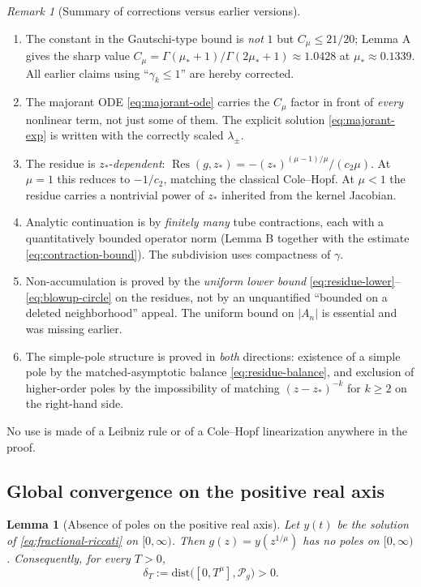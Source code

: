 \documentclass[11pt]{article}
\newtheorem{lemma}[theorem]{Lemma}
\theoremstyle{definition}
\theoremstyle{remark}
\newtheorem{remark}[theorem]{Remark}
\DeclareMathOperator{\Res}{Res}
\begin{document}
\begin{remark}[Summary of corrections versus earlier versions]
\label{rem:meromorphy-corrections}
\begin{enumerate}[label=(\alph*)]
\item The constant in the Gautschi-type bound is \emph{not} $1$ but $C_{\mu}\le 21/20$; Lemma A gives the sharp value $C_{\mu}=\Gamma(\mu_{*}+1)/\Gamma(2\mu_{*}+1)\approx 1.0428$ at $\mu_{*}\approx 0.1339$. All earlier claims using ``$\gamma_{k}\le 1$'' are hereby corrected.
\item The majorant ODE \eqref{eq:majorant-ode} carries the $C_{\mu}$ factor in front of \emph{every} nonlinear term, not just some of them. The explicit solution \eqref{eq:majorant-exp} is written with the correctly scaled $\lambda_{\pm}$.
\item The residue is $z_{*}$-\emph{dependent}: $\Res(g,z_{*})=-(z_{*})^{(\mu-1)/\mu}/(c_{2}\mu)$. At $\mu=1$ this reduces to $-1/c_{2}$, matching the classical Cole--Hopf. At $\mu<1$ the residue carries a nontrivial power of $z_{*}$ inherited from the kernel Jacobian.
\item Analytic continuation is by \emph{finitely many} tube contractions, each with a quantitatively bounded operator norm (Lemma B together with the estimate \eqref{eq:contraction-bound}). The subdivision uses compactness of $\gamma$.
\item Non-accumulation is proved by the \emph{uniform lower bound} \eqref{eq:residue-lower}--\eqref{eq:blowup-circle} on the residues, not by an unquantified ``bounded on a deleted neighborhood'' appeal. The uniform bound on $|A_{n}|$ is essential and was missing earlier.
\item The simple-pole structure is proved in \emph{both} directions: existence of a simple pole by the matched-asymptotic balance \eqref{eq:residue-balance}, and exclusion of higher-order poles by the impossibility of matching $(z-z_{*})^{-k}$ for $k\ge 2$ on the right-hand side.
\end{enumerate}
No use is made of a Leibniz rule or of a Cole--Hopf linearization anywhere in the proof.
\end{remark}

\subsection{Global convergence on the positive real axis}
\label{sec:heston-global}

\begin{lemma}[Absence of poles on the positive real axis]
\label{lem:no-real-poles}
Let $y(t)$ be the solution of \eqref{eq:fractional-riccati} on $[0,\infty)$. Then $g(z)=y(z^{1/\mu})$ has no poles on $[0,\infty)$. Consequently, for every $T>0$,
\begin{equation}
\delta_{T}:=\mathrm{dist}\bigl([0,T^{\mu}],\mathcal{P}_{g}\bigr)>0.
\label{eq:delta-T}
\end{equation}
\end{lemma}
\end{document}
